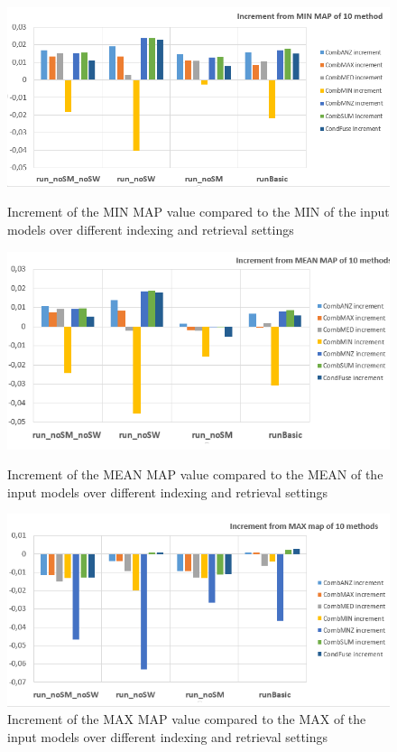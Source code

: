 	\begin{figure}	
		\begin{minipage}[H]{0.5\linewidth}
			\centering
			\includegraphics[width=\linewidth]{../eval/results-img-graphs/incrementFromMIN.png}
			\caption{Increment of the MIN MAP value compared to the MIN of the input models over different indexing and retrieval settings}				
			\label{fig:MINincr}
		\end{minipage}
		\begin{minipage}[H]{0.5\linewidth}
			\centering
			\includegraphics[width=\linewidth]{../eval/results-img-graphs/incrementFromMEAN.png}
			\caption{Increment of the MEAN MAP value compared to the MEAN of the input models over different indexing and retrieval settings}				
			\label{fig:MEANincr}
		\end{minipage}
		\begin{minipage}[H]{0.5\linewidth}
			\centering
			\includegraphics[width=\linewidth]{../eval/results-img-graphs/incrementFromMAX.png}
			\caption{Increment of the MAX MAP value compared to the MAX of the input models over different indexing and retrieval settings}				
			\label{fig:MAXincr}
		\end{minipage}
	\end{figure}
	
